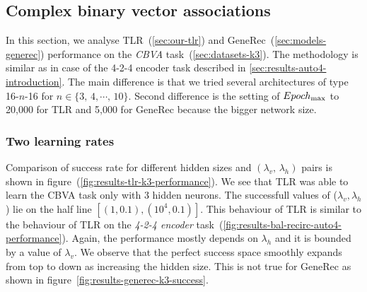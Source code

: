 

\subsection{Complex binary vector associations} 
\label{sec:results-k3}

In this section, we analyse TLR~(\ref{sec:our-tlr}) and GeneRec~(\ref{sec:models-generec}) performance on the \emph{CBVA} task~(\ref{sec:datasets-k3}). The methodology is similar as in case of the 4-2-4 encoder task described in \ref{sec:results-auto4-introduction}. The main difference is that we tried several architectures of type 16-$n$-16 for $n \in \{3,\,4,\cdots,\,10\}$. Second difference is the setting of $Epoch_{\rm max}$ to 20,000 for TLR and 5,000 for GeneRec because the bigger network size. 

\subsubsection{Two learning rates} 
\label{sec:tlr-k3}

Comparison of success rate for different hidden sizes and $(\lambda_v,\,\lambda_h)$ pairs is shown in figure~(\ref{fig:results-tlr-k3-performance}). We see that TLR was able to learn the CBVA task only with 3 hidden neurons. The successfull values of ($\lambda_v, \lambda_h$) lie on the half line $[(1, 0.1), (10^4, 0.1)]$. This behaviour of TLR is similar to the behaviour of TLR on the \emph{4-2-4 encoder} task~(\ref{fig:results-bal-recirc-auto4-performance}). Again, the performance mostly depends on $\lambda_h$ and it is bounded by a value of $\lambda_v$. We observe that the perfect success space smoothly expands from top to down as increasing the hidden size. This is not true for GeneRec as shown in figure~\ref{fig:results-generec-k3-success}. 


